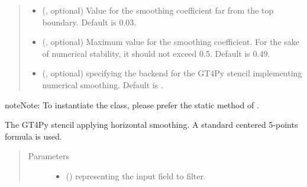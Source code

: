 \documentclass[letterpaper,10pt,english]{sphinxmanual}
\begin{document}
\begin{fulllineitems}
\begin{fulllineitems}
\begin{quote}
\begin{description}
\begin{itemize}
\item {} 
 (, optional) \textendash{} Value for the smoothing coefficient far from the top boundary. Default is 0.03.

\item {} 
 (, optional) \textendash{} Maximum value for the smoothing coefficient. For the sake of numerical stability, it should not
exceed 0.5. Default is 0.49.

\item {} 
 (, optional) \textendash{}  specifying the backend for the GT4Py stencil implementing numerical
smoothing. Default is .

\end{itemize}

\end{description}\end{quote}

\begin{sphinxadmonition}{note}{Note:}
To instantiate the class, please prefer the static method
{\hyperref[\detokenize{api:tasmania.dycore.horizontal_smoothing.HorizontalSmoothing.factory}]{}}
of {\hyperref[\detokenize{api:tasmania.dycore.horizontal_smoothing.HorizontalSmoothing}]{}}.
\end{sphinxadmonition}

\end{fulllineitems}


\begin{fulllineitems}
\label{\detokenize{api:tasmania.dycore.horizontal_smoothing.HorizontalSmoothingSecondOrderXZ._stencil_defs}}
The GT4Py stencil applying horizontal smoothing. A standard centered 5-points formula is used.
\begin{quote}\begin{description}
\item[{Parameters}] \leavevmode\begin{itemize}
\item {} 
 () \textendash{}  representing the input field to filter.


\end{itemize}
\end{description}
\end{quote}
\end{fulllineitems}
\end{fulllineitems}
\end{document}
